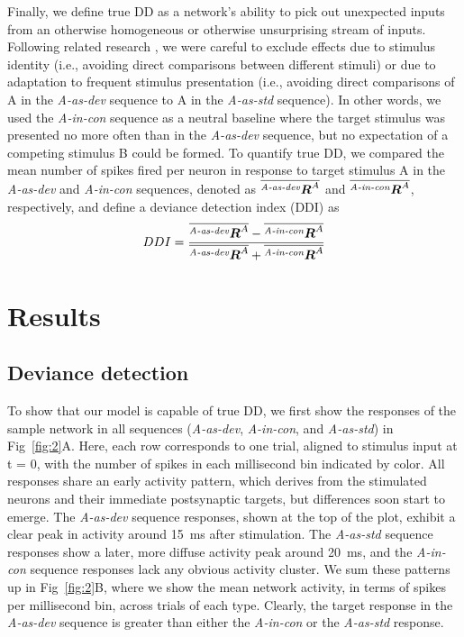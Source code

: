 \documentclass[10pt,letterpaper]{article}
\newcommand{\dev}{\textit{A-as-dev}}
\newcommand{\msc}{\textit{A-in-con}}
\newcommand{\std}{\textit{A-as-std}}
\newcommand{\ifstringequal}[4]{%
  \ifnum\pdfstrcmp{#1}{#2}=0
  #3%
  \else
  #4%
  \fi
}
\newcommand{\seqreplace}[1]{\ifstringequal{dev}{#1}{\dev}{%
    \ifstringequal{std}{#1}{\std}{%
        \ifstringequal{msc}{#1}{\msc}{#1}%
    }%
}}
\newcommand{\R}[3][]{{}^{\seqreplace{#1}}_{}\boldsymbol R^{#2}_{#3}}
\newcommand{\mean}[1]{\overline{#1}}
\newcommand{\FIG}[1]{Fig~\ref{fig:#1}}
\begin{document}
Finally, we define true DD as a network's ability to pick out unexpected inputs from an otherwise homogeneous or otherwise unsurprising stream of inputs. Following related research \cite{Kubota2021-dx,Harms2014-ah,Jacobsen2001-sc}, we were careful to exclude effects due to stimulus identity (i.e., avoiding direct comparisons between different stimuli) or due to adaptation to frequent stimulus presentation (i.e., avoiding direct comparisons of A in the \dev{} sequence to A in the \std{} sequence). In other words, we used the \msc{} sequence as a neutral baseline where the target stimulus was presented no more often than in the \dev{} sequence, but no expectation of a competing stimulus B could be formed. To quantify true DD, we compared the mean number of spikes fired per neuron in response to target stimulus A in the \dev{} and \msc{} sequences, denoted as $\mean{\R[dev]{A}{}}$ and $\mean{\R[msc]{A}{}}$, respectively, and define a deviance detection index (DDI) as
\begin{equation}
    DDI = \frac{\mean{\R[dev]{A}{}} - \mean{\R[msc]{A}{}}}{\mean{\R[dev]{A}{}} + \mean{\R[msc]{A}{}}} \label{eq:ddi}
\end{equation}

\section*{Results}

\subsection*{Deviance detection}

To show that our model is capable of true DD, we first show the responses of the sample network in all sequences (\dev{}, \msc{}, and \std{}) in \FIG{2}A. Here, each row corresponds to one trial, aligned to stimulus input at t = 0, with the number of spikes in each millisecond bin indicated by color. All responses share an early activity pattern, which derives from the stimulated neurons and their immediate postsynaptic targets, but differences soon start to emerge. The \dev{} sequence responses, shown at the top of the plot, exhibit a clear peak in activity around \qty{15}{\milli\second} after stimulation. The \std{} sequence responses show a later, more diffuse activity peak around \qty{20}{\milli\second}, and the \msc{} sequence responses lack any obvious activity cluster. We sum these patterns up in \FIG{2}B, where we show the mean network activity, in terms of spikes per millisecond bin, across trials of each type. Clearly, the target response in the \dev{} sequence is greater than either the \msc{} or the \std{} response.
\end{document}
